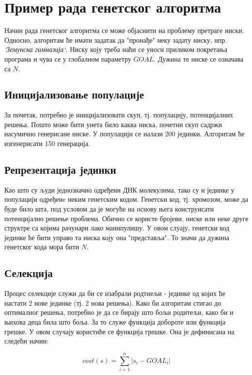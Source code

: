 \documentclass{article}
\begin{document}
\section{Пример рада генетског алгоритма}

Начин рада генетског алгоритма се може објаснити на проблему претраге ниски. Односно,
алгоритам ће имати задатак да "пронађе" неку задату ниску, нпр. \textit{`Земунска гимназија`}.
Ниску коју треба наћи се уноси приликом покретања програма и чува се у глобалном
параметру $GOAL$. Дужина те ниске се означава са $N$.

\subsection{Иницијализовање популације}
За почетак, потребно је иницијализовати скуп, тј. популацију, потенцијалних решења.
Пошто може бити унета било каква ниска, почетни скуп садржи насумично генерисане ниске.
У популацији се налази 200 јединки. Алгоритам ће изгенерисати 150 генерација. 

\subsection{Репрезентација јединки}
Као што су људи једнозначно одређени ДНК молекулима, тако су и јединке у популацији
одређенe неким генетским кодом. Генетски код, тј. хромозом, може да буде било шта, под условом да
је могуће на основу њега конструисати потенцијално решење проблема. Обично се користе бројеви, ниске или неке друге 
структре са којима рачунари лако манипулишу. У овом слуају, генетски код јединке
ће бити управо та ниска коју она "представља". То значи да дужина генетског кода мора бити $N$.

\subsection{Селекција}
Процес селекције служи да би се изабрали родтиељи - јединке од којих ће настати 2 нове 
јединке (тј. 2 нова решења). Како би алгоритам стигао до оптималног решења, потребно 
је да се бирају што бољи родитељи, како би и њихова деца била што боља. За то служе функција добороте или функција грешке.
У овом случају користиће се функција грешке. Она је дефинисана на следећи начин: 

\begin{equation*}
    cost(s)=\sum_{i=1}^{n} |s_i - GOAL_i| 
\end{equation*}
\end{document}
